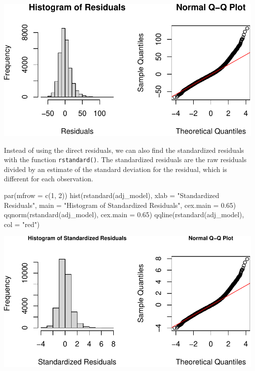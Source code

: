 \documentclass[
  letterpaper,
]{latex/krantz}
\makeatletter
\newenvironment{Shaded}{\begin{snugshade}}{\end{snugshade}}
\newcommand{\AttributeTok}[1]{\textcolor[rgb]{0.40,0.45,0.13}{#1}}
\newcommand{\DecValTok}[1]{\textcolor[rgb]{0.68,0.00,0.00}{#1}}
\newcommand{\FloatTok}[1]{\textcolor[rgb]{0.68,0.00,0.00}{#1}}
\newcommand{\FunctionTok}[1]{\textcolor[rgb]{0.28,0.35,0.67}{#1}}
\newcommand{\NormalTok}[1]{\textcolor[rgb]{0.00,0.23,0.31}{#1}}
\newcommand{\StringTok}[1]{\textcolor[rgb]{0.13,0.47,0.30}{#1}}
\newenvironment{kframe}{%
\medskip{}
\setlength{\fboxsep}{.8em}
 \def\at@end@of@kframe{}%
 \ifinner\ifhmode%
  \def\at@end@of@kframe{\end{minipage}}%
  \begin{minipage}{\columnwidth}%
 \fi\fi%
 \def\FrameCommand##1{\hskip\@totalleftmargin \hskip-\fboxsep
 \colorbox{shadecolor}{##1}\hskip-\fboxsep
     \hskip-\linewidth \hskip-\@totalleftmargin \hskip\columnwidth}%
 \MakeFramed {\advance\hsize-\width
   \@totalleftmargin\z@ \linewidth\hsize
   \@setminipage}}%
 {\par\unskip\endMakeFramed%
 \at@end@of@kframe}
\renewenvironment{Shaded}{\begin{kframe}}{\end{kframe}}
\makeatother
\begin{document}
\begin{center}
\includegraphics[width=1\textwidth,height=\textheight]{book/linear_regression_files/figure-pdf/unnamed-chunk-17-1.pdf}
\end{center}

Instead of using the direct residuals, we can also find the standardized
residuals with the function
\texttt{rstandard()}.
The standardized residuals are the raw residuals divided by an estimate
of the standard deviation for the residual, which is different for each
observation.

\begin{Shaded}
\begin{Highlighting}[]
\FunctionTok{par}\NormalTok{(}\AttributeTok{mfrow =} \FunctionTok{c}\NormalTok{(}\DecValTok{1}\NormalTok{, }\DecValTok{2}\NormalTok{)) }
\FunctionTok{hist}\NormalTok{(}\FunctionTok{rstandard}\NormalTok{(adj\_model), }\AttributeTok{xlab =} \StringTok{"Standardized Residuals"}\NormalTok{, }
     \AttributeTok{main =} \StringTok{"Histogram of Standardized Residuals"}\NormalTok{,}
     \AttributeTok{cex.main =} \FloatTok{0.65}\NormalTok{) }
\FunctionTok{qqnorm}\NormalTok{(}\FunctionTok{rstandard}\NormalTok{(adj\_model), }\AttributeTok{cex.main =} \FloatTok{0.65}\NormalTok{) }
\FunctionTok{qqline}\NormalTok{(}\FunctionTok{rstandard}\NormalTok{(adj\_model), }\AttributeTok{col =} \StringTok{"red"}\NormalTok{)}
\end{Highlighting}
\end{Shaded}

\begin{center}
\includegraphics[width=1\textwidth,height=\textheight]{book/linear_regression_files/figure-pdf/unnamed-chunk-18-1.pdf}
\end{center}
\end{document}
